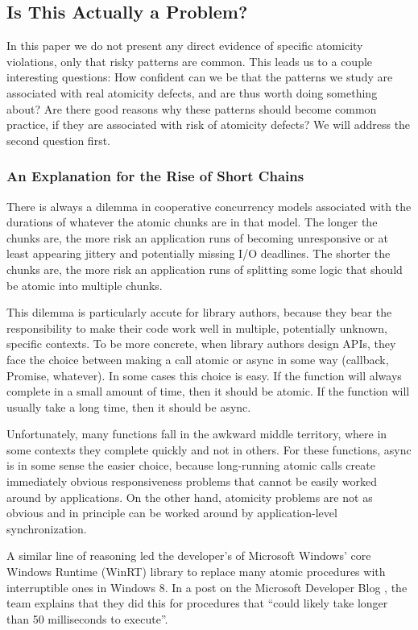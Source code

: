 \documentclass[acmsmall,anonymous,review]{acmart}\settopmatter{printfolios=true,printccs=false,printacmref=false}
\begin{document}
\subsection{Is This Actually a Problem?}

In this paper we do not present any direct evidence of specific atomicity violations, only that risky patterns are common.
This leads us to a couple interesting questions:
How confident can we be that the patterns we study are associated with real atomicity defects, and are thus worth doing something about?
Are there good reasons why these patterns should become common practice, if they are associated with risk of atomicity defects?
We will address the second question first.

\subsubsection{An Explanation for the Rise of Short Chains}

There is always a dilemma in cooperative concurrency models associated with the durations of whatever the atomic chunks are in that model.
The longer the chunks are, the more risk an application runs of becoming unresponsive or at least appearing jittery and potentially missing I/O deadlines.
The shorter the chunks are, the more risk an application runs of splitting some logic that should be atomic into multiple chunks.

This dilemma is particularly accute for library authors, because they bear the responsibility to make their code work well in multiple, potentially unknown, specific contexts.
To be more concrete, when library authors design APIs, they face the choice between making a call atomic or async in some way (callback, Promise, whatever).
In some cases this choice is easy.
If the function will always complete in a small amount of time, then it should be atomic.
If the function will usually take a long time, then it should be async.

Unfortunately, many functions fall in the awkward middle territory, where in some contexts they complete quickly and not in others.
For these functions, async is in some sense the easier choice, because long-running atomic calls create immediately obvious responsiveness problems that cannot be easily worked around by applications.
On the other hand, atomicity problems are not as obvious and in principle can be worked around by application-level synchronization.

A similar line of reasoning led the developer's of Microsoft Windows' core Windows Runtime (WinRT) library to replace many atomic procedures with interruptible ones in Windows 8.
In a post on the Microsoft Developer Blog \cite{Windows8Team2012}, the team explains that they did this for procedures that ``could likely take longer than 50 milliseconds to execute''.
\end{document}
